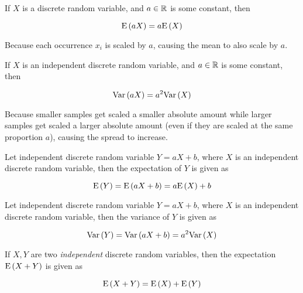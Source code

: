 \begin{definition}
    If $X$ is a discrete random variable, and $a \in \mathbb{R}$ is some constant,
    then

    \begin{equation}
        \mathrm{E} \left( aX \right) = a\mathrm{E} \left( X \right)
    \end{equation}

    Because each occurrence $x_i$ is scaled by $a$, causing the mean to also
    scale by $a$.
\end{definition}

\begin{definition}
    If $X$ is an independent discrete random variable, and $a \in \mathbb{R}$ is
    some constant, then

    \begin{equation}
        \mathrm{Var} \left( aX \right) = a^2 \mathrm{Var} \left( X \right)
    \end{equation}

    Because smaller samples get scaled a smaller absolute amount while larger
    samples get scaled a larger absolute amount (even if they are scaled at
    the same proportion $a$), causing the spread to increase.
\end{definition}

\begin{definition}
    Let independent discrete random variable $Y = aX + b$, where $X$ is an
    independent discrete random variable, then the expectation of $Y$ is given
    as

    \begin{equation}
        \mathrm{E} \left( Y \right) = \mathrm{E} \left( aX + b \right) = a\mathrm{E} \left( X \right) + b
    \end{equation}
\end{definition}

\begin{definition}
    Let independent discrete random variable $Y = aX + b$, where $X$ is an
    independent discrete random variable, then the variance of $Y$ is given as

    \begin{equation}
        \mathrm{Var} \left( Y \right) = \mathrm{Var} \left( aX + b \right) = a^2 \mathrm{Var} \left( X \right)
    \end{equation}
\end{definition}

\begin{definition}
    If $X, Y$ are two \textit{independent} discrete random variables, then the
    expectation $\mathrm{E} \left( X + Y \right)$ is given as

    \begin{equation}
        \mathrm{E} \left( X + Y \right) = \mathrm{E} \left( X \right) + \mathrm{E} \left( Y \right)
    \end{equation}
\end{definition}

